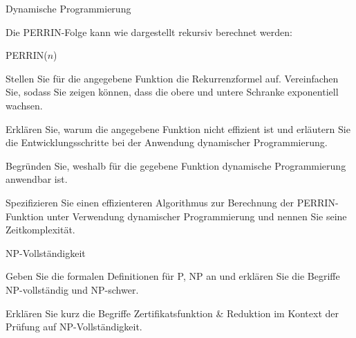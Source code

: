 \documentclass{exercisesheet}
\begin{document}
\begin{eexercises}{Dynamische Programmierung}{
    Die PERRIN-Folge kann wie dargestellt rekursiv berechnet werden:
    \begin{algorithm}[ht]
      \caption{PERRIN($n$)}
    \end{algorithm}
  }
  \item Stellen Sie für die angegebene Funktion die Rekurrenzformel auf. Vereinfachen Sie, sodass Sie zeigen können, dass die obere und untere Schranke exponentiell wachsen.
  \item Erklären Sie, warum die angegebene Funktion nicht effizient ist und erläutern Sie die Entwicklungsschritte bei der Anwendung dynamischer Programmierung.
  \item Begründen Sie, weshalb für die gegebene Funktion dynamische Programmierung anwendbar ist.
  \item Spezifizieren Sie einen effizienteren Algorithmus zur Berechnung der PERRIN-Funktion unter Verwendung dynamischer Programmierung und nennen Sie seine Zeitkomplexität.
\end{eexercises}

\begin{exercises}{NP-Vollständigkeit}
\item Geben Sie die formalen Definitionen für P, NP an und erklären Sie die Begriffe NP-vollständig und NP-schwer.
\item Erklären Sie kurz die Begriffe Zertifikatsfunktion \& Reduktion im Kontext der Prüfung auf NP-Vollständigkeit.
\end{exercises}



\end{document}
